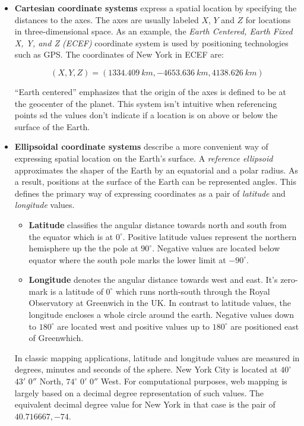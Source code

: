 \begin{itemize}

\item \textbf{Cartesian coordinate systems} express a spatial location by specifying the distances to the axes. The axes are usually labeled $X$, $Y$ and $Z$ for locations in three-dimensional space. As an example, the \textit{Earth Centered, Earth Fixed X, Y, and Z (ECEF)} coordinate system is used by positioning technologies such as GPS. The coordinates of New York in ECEF are:

\[ (X, Y, Z) = (1334.409~km, -4653.636~km, 4138.626~km) \]

``Earth centered'' emphasizes that the origin of the axes is defined to be at the geocenter of the planet. This system isn't intuitive when referencing points sd the values don't indicate if a location is on above or below the surface of the Earth. 

\item \textbf{Ellipsoidal coordinate systems} describe a more convenient way of expressing spatial location on the Earth's surface. A \textit{reference ellipsoid} approximates the shaper of the Earth by an equatorial and a polar radius. As a result, positions at the surface of the Earth can be represented angles. This defines the primary way of expressing coordinates as a pair of \textit{latitude} and \textit{longitude} values.

  \begin{itemize}

  \item \textbf{Latitude} classifies the angular distance towards north and south from the equator which is at $0^\circ$. Positive latitude values represent the northern hemisphere up the the pole at $90^\circ$. Negative values are located below equator where the south pole marks the lower limit at $-90^\circ$.

  \item \textbf{Longitude} denotes the angular distance towards west and east. It's zero-mark is a latitude of $0^\circ$  which runs north-south through the Royal Observatory at Greenwich in the UK. In contrast to latitude values, the longitude encloses a whole circle around the earth. Negative values down to $180^\circ$ are located west and positive values up to $180^\circ$ are positioned east of Greenwhich.

  \end{itemize}


In classic mapping applications, latitude and longitude values are measured in degrees, minutes and seconds of the sphere. New York City is located at $40^\circ$ $43'$ $0''$ North, $74^\circ$ $0'$ $0''$ West. For computational purposes, web mapping is largely based on a decimal degree representation of such values. The equivalent decimal degree value for New York in that case is the pair of $40.716667, -74$.


\end{itemize}

